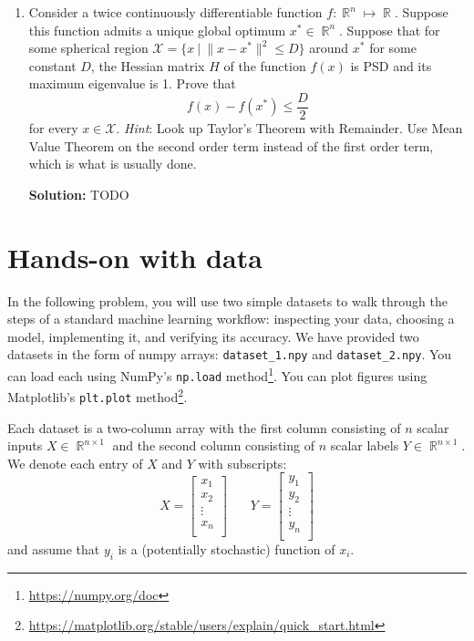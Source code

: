 \documentclass{article}
\newcommand{\Question}[1]{\Large \section{ #1 } \normalsize}
\DeclareMathOperator{\R}{\mathbb{R}}
\newenvironment{solution}{\color{blue} \smallskip \textbf{Solution:}}{}
\begin{document}
\begin{enumerate}
\begin{enumerate}
        You may use the fact that $\Gamma(x + 1)$ interpolates the factorial function without proof.
    \end{enumerate}

    \begin{solution}
        TODO
    \end{solution}

    \item 
    Consider a twice continuously differentiable function $f: \R^{n} \mapsto \R$. 
    Suppose this function admits a unique global optimum $x^* \in \R^n$. 
    Suppose that for some spherical region $\mathcal{X} = \{x \ | \ \|x-x^*\|^2 \leq D\}$ around $x^*$ for some constant $D$, the Hessian matrix $H$ of the function $f(x)$ is PSD and its maximum eigenvalue is 1. 
    Prove that
    \[
        f(x) - f(x^*) \leq \frac{D}{2} 
    \]
    for every $x \in \mathcal{X}$.
    {\em Hint}: Look up Taylor's Theorem with Remainder. 
    Use Mean Value Theorem on the second order term instead of the first order term, which is what is usually done.

    \begin{solution}
        TODO
    \end{solution}

\end{enumerate}

\newpage
\Question{Hands-on with data}

In the following problem, you will use two simple datasets to walk through the steps of a standard machine learning workflow: inspecting your data, choosing a model, implementing it, and verifying its accuracy. 
We have provided two datasets in the form of numpy arrays: \texttt{dataset\_1.npy} and \texttt{dataset\_2.npy}. 
You can load each using NumPy's \texttt{np.load} method\footnote{\href{https://numpy.org/doc/}{https://numpy.org/doc}}. 
You can plot figures using Matplotlib's \texttt{plt.plot} method\footnote{\href{https://matplotlib.org/stable/users/explain/quick_start.html}{https://matplotlib.org/stable/users/explain/quick\_start.html}}.

Each dataset is a two-column array with the first column consisting of $n$ scalar inputs $X \in \R^{n \times 1}$ and the second column consisting of $n$ scalar labels $Y \in \R^{n \times 1}$. 
We denote each entry of $X$ and $Y$ with subscripts:
\[
    X = 
    \begin{bmatrix}
        x_1 \\
        x_2 \\
        \vdots \\
        x_n \\
    \end{bmatrix}
    ~~~~~~~~
    Y = 
    \begin{bmatrix}
        y_1 \\
        y_2 \\
        \vdots \\
        y_n \\
    \end{bmatrix}
\]
and assume that $y_i$ is a (potentially stochastic) function of $x_i$.
\end{document}
